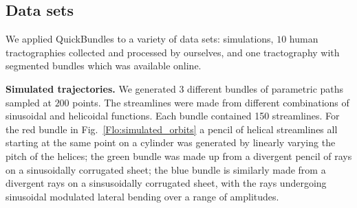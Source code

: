 \documentclass{bioinfo}
\begin{document}
\begin{methods}

\subsection{\label{sub:QB-Data-sets}Data sets}

We applied QuickBundles to a variety of data sets: simulations, $10$
human tractographies collected and processed by ourselves, and one
tractography with segmented bundles which was available online.

\textbf{Simulated trajectories.} We generated $3$ different bundles of
parametric paths sampled at $200$ points. The streamlines were made from
different combinations of sinusoidal and helicoidal functions.  Each
bundle contained 150 streamlines.  For the red bundle in
Fig.~\ref{Flo:simulated_orbits} a pencil of helical streamlines all
starting at the same point on a cylinder was generated by linearly
varying the pitch of the helices; the green bundle was made up from a
divergent pencil of rays on a sinusoidally corrugated sheet; the blue
bundle is similarly made from a divergent rays on a sinsusoidally
corrugated sheet, with the rays undergoing sinusoidal modulated lateral
bending over a range of amplitudes.


\end{methods}
\end{document}
